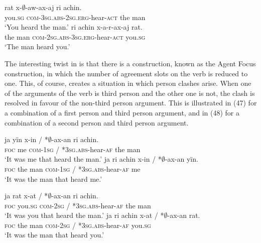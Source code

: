 \documentclass[output=paper]{langsci/langscibook}
\begin{document}
\ea {}
\ea 
 \gll rat  x-$\emptyset$-aw-ax-aj             ri   achin.    \\
      you.\textsc{sg} \textsc{com}{}-\textsc{3sg.abs-2sg.erg}{}-hear-\textsc{act} the man\\
 \glt ‘You heard the man.’
\ex \gll       ri achin  x-a-r-ax-aj              rat.\\
         the man \textsc{com-2sg.abs-3sg.erg}{}-hear-\textsc{act} you.\textsc{sg}\\
\glt ‘The man heard you.’
\z
\z

The interesting twist in  is that there is a construction, known as the Agent Focus construction, in which the number of agreement slots on the verb is reduced to one. This, of course, creates a situation in which person clashes arise. When one of the arguments of the verb is third person and the other one is not, the clash is resolved in favour of the non-third person argument. This is illustrated in (47) for a combination of a first person and third person argument, and in (48) for a combination of a second person and third person argument.

\ea \label{bkm:Ref454183795}  
\ea \gll   ja    yïn x-in / *$\emptyset$-ax-an              ri   achin.\\
    \textsc{foc} me \textsc{com-1sg} / \textsc{*3sg.abs}{}-hear-\textsc{af} the man\\
\glt    ‘It was me that heard the man.’
\ex
\gll  ja    ri    achin x-in / *$\emptyset$-ax-an                      yïn.\\
    \textsc{foc} the man  \textsc{com-1sg} / \textsc{*3sg.abs}{}-hear-\textsc{af} me\\
\glt    ‘It was the man that heard me.’
\z
\z

\ea \label{bkm:Ref454183994} 
\ea \gll  ja     rat x-at / *$\emptyset$-ax-an          ri   achin.\\
    \textsc{foc} you.\textsc{sg} \textsc{com-2sg} / \textsc{*3sg.abs}{}-hear-\textsc{af} the man\\
\glt    ‘It was you that heard the man.’
\ex
\gll ja    ri    achin x-at / *$\emptyset$-ax-an                        rat.\\
    \textsc{foc} the man   \textsc{com}{}-\textsc{2sg} / \textsc{*3sg.abs}{}-hear-\textsc{af} you.\textsc{sg}\\
\glt    ‘It was the man that heard you.’
\z
\z
\end{document}
